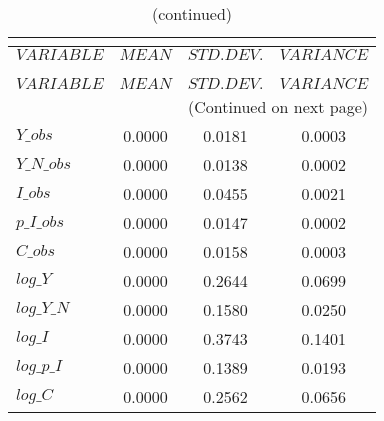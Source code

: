  
\begin{center}
\begin{longtable}{lccc} 
\caption{THEORETICAL MOMENTS}\\
 \label{Table:th_moments}\\
\toprule 
$VARIABLE   $	 & 	 $         MEAN$	 & 	 $    STD. DEV.$	 & 	 $     VARIANCE$\\
\midrule \endfirsthead 
\caption{(continued)}\\
 \toprule \\ 
$VARIABLE   $	 & 	 $         MEAN$	 & 	 $    STD. DEV.$	 & 	 $     VARIANCE$\\
\midrule \endhead 
\midrule \multicolumn{4}{r}{(Continued on next page)} \\ \bottomrule \endfoot 
\bottomrule \endlastfoot 
$Y\_obs     $	 & 	       0.0000	 & 	       0.0181	 & 	       0.0003 \\ 
$Y\_N\_obs  $	 & 	       0.0000	 & 	       0.0138	 & 	       0.0002 \\ 
$I\_obs     $	 & 	       0.0000	 & 	       0.0455	 & 	       0.0021 \\ 
$p\_I\_obs  $	 & 	       0.0000	 & 	       0.0147	 & 	       0.0002 \\ 
$C\_obs     $	 & 	       0.0000	 & 	       0.0158	 & 	       0.0003 \\ 
$log\_Y     $	 & 	       0.0000	 & 	       0.2644	 & 	       0.0699 \\ 
$log\_Y\_N  $	 & 	       0.0000	 & 	       0.1580	 & 	       0.0250 \\ 
$log\_I     $	 & 	       0.0000	 & 	       0.3743	 & 	       0.1401 \\ 
$log\_p\_I  $	 & 	       0.0000	 & 	       0.1389	 & 	       0.0193 \\ 
$log\_C     $	 & 	       0.0000	 & 	       0.2562	 & 	       0.0656 \\ 
\end{longtable}
 \end{center}
